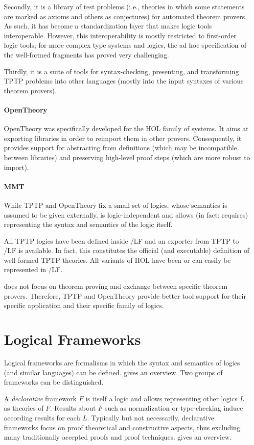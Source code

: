 \documentclass[12pt]{article}
\newcommand{\system}[2][]{\paragraph{#2}#2 \ifnonempty[\cite{#2}]{#1}{\cite{#1}}}
\begin{document}
Secondly, it is a library of test problems (i.e., theories in which some statements are marked as axioms and others as conjectures) for automated theorem provers.
As such, it has become a standardization layer that makes logic tools interoperable.
However, this interoperability is mostly restricted to first-order logic tools; for more complex type systems and logics, the ad hoc specification of the well-formed fragments has proved very challenging.

Thirdly, it is a suite of tools for syntax-checking, presenting, and transforming TPTP problems into other languages (mostly into the input syntaxes of various theorem provers).

\system{OpenTheory} was specifically developed for the HOL family of systems.
It aims at exporting libraries in order to reimport them in other provers.
Consequently, it provides support for abstracting from definitions (which may be incompatible between libraries) and preserving high-level proof steps (which are more robust to import).

\paragraph{MMT}
While TPTP and OpenTheory fix a small set of logics, whose semantics is assumed to be given externally, \mmt is logic-independent and allows (in fact: requires) representing the syntax and semantics of the logic itself.

All TPTP logics have been defined inside \mmt/LF and an exporter from TPTP to \mmt/LF is available.
In fact, this constitutes the official (and executable) definition of well-formed TPTP theories.
All variants of HOL have been or can easily be represented in \mmt/LF.

\mmt does not focus on theorem proving and exchange between specific theorem provers.
Therefore, TPTP and OpenTheory provide better tool support for their specific application and their specific family of logics.

\section{Logical Frameworks}

Logical frameworks are formalisms in which the syntax and semantics of logics (and similar languages) can be defined.
\cite{rabe:howto:14} gives an overview.
Two groups of frameworks can be distinguished.

A \emph{declarative} framework $F$ is itself a logic and allows representing other logics $L$ as theories of $F$.
Results about $F$ such as normalization or type-checking induce according results for each $L$.
Typically but not necessarily, declarative frameworks focus on proof theoretical and constructive aspects, thus excluding many traditionally accepted proofs and proof techniques.
\cite{logicalframeworks} gives an overview.
\end{document}

